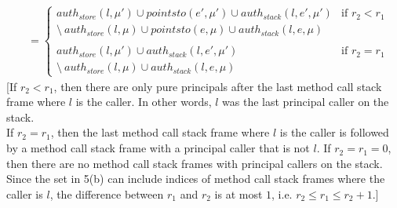 \documentclass{llncs}
\newcommand{\intuition}[1]{#1}
\begin{document}
\begin{mdframed}
\begin{lemma}
\vspace{-7pt}
\begin{align*}
&=
\begin{cases}
    auth_{store}(l, \mu') \cup pointsto(e', \mu') \cup auth_{stack}(l, e', \mu') & \text{if } r_2 < r_1\\
    \setminus~auth_{store}(l, \mu) \cup pointsto(e, \mu) \cup auth_{stack}(l, e, \mu)\\\\
    auth_{store}(l, \mu') \cup auth_{stack}(l, e', \mu')& \text{if } r_2 = r_1\\
    \setminus~auth_{store}(l, \mu) \cup auth_{stack}(l, e, \mu)
\end{cases}
\end{align*}
\intuition{[If $r_2 < r_1$, then there are only pure principals after the last method call stack frame where $l$ is the caller. In other words, $l$ was the last principal caller on the stack.\\
If $r_2 = r_1$, then the last method call stack frame where $l$ is the caller is followed by a method call stack frame with a principal caller that is not $l$. If $r_2 = r_1 = 0$, then there are no method call stack frames with principal callers on the stack.\\
Since the set in 5(b) can include indices of method call stack frames where the caller is $l$, the difference between $r_1$ and $r_2$ is at most $1$, i.e. $r_2 \le r_1 \le r_2 + 1$.]}
\end{lemma}
\end{mdframed}
\end{document}
